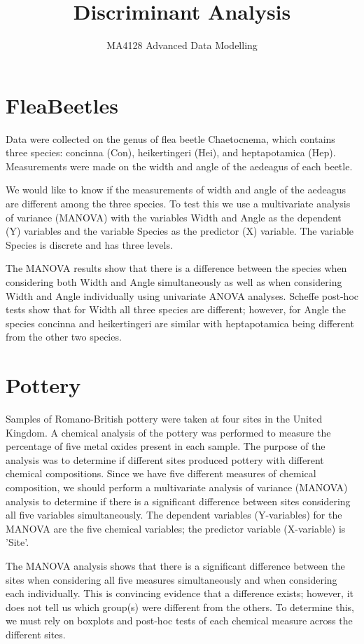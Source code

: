 \documentclass[11pt]{article} %
\title{Discriminant Analysis}
\author{MA4128 Advanced Data Modelling}
\begin{document}
\section{FleaBeetles}

Data were collected on the genus of flea beetle Chaetocnema, which contains three species: concinna (Con), heikertingeri (Hei), and heptapotamica (Hep). Measurements were made on the width and angle of the aedeagus of each beetle.

\bigskip

We would like to know if the measurements of width and angle of the aedeagus are different among the three species. To test this we use a multivariate analysis of variance (MANOVA) with the variables Width and Angle as the dependent (Y) variables and the variable Species as the predictor (X) variable. The variable Species is discrete and has three levels.

\bigskip

The MANOVA results show that there is a difference between the species when considering both Width and Angle simultaneously as well as when considering Width and Angle individually using univariate ANOVA analyses. Scheffe post-hoc tests show that for Width all three species are different; however, for Angle the species concinna and heikertingeri are similar with heptapotamica being different from the other two species. 

\newpage

\section{Pottery}

Samples of Romano-British pottery were taken at four sites in the United Kingdom. A chemical analysis of the pottery was performed to measure the percentage of five metal oxides present in each sample. The purpose of the analysis was to determine if different sites produced pottery with different chemical compositions.
Since we have five different measures of chemical composition, we should perform a multivariate analysis of variance (MANOVA) analysis to determine if there is a significant difference between sites considering all five variables simultaneously. The dependent variables (Y-variables) for the MANOVA are the five chemical variables; the predictor variable (X-variable) is 'Site'.

\bigskip

The MANOVA analysis shows that there is a significant difference between the sites when considering all five measures simultaneously and when considering each individually. This is convincing evidence that a difference exists; however, it does not tell us which group(s) were different from the others. To determine this, we must rely on boxplots and post-hoc tests of each chemical measure across the different sites.
\end{document}
